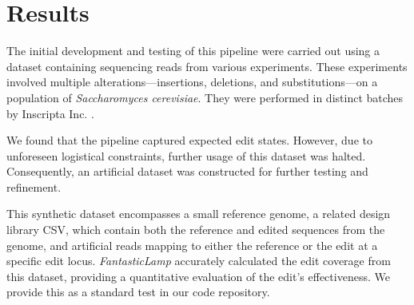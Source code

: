 \documentclass{bioinfo}
\theoremstyle{definition}
\begin{document}

\section*{Results}
\label{sec:results}

The initial development and testing of this pipeline were carried out using a dataset containing sequencing reads from various experiments.
These experiments involved multiple alterations---insertions, deletions, and substitutions---on a population of \textit{Saccharomyces cerevisiae}.
They were performed in distinct batches by Inscripta Inc. \citep{gander2021simultaneous}.

We found that the pipeline captured expected edit states.
However, due to unforeseen logistical constraints, further usage of this dataset was halted.
Consequently, an artificial dataset was constructed for further testing and refinement.

This synthetic dataset encompasses a small reference genome, a related design library CSV, which contain both the reference and edited sequences from the genome, and artificial reads mapping to either the reference or the edit at a specific edit locus. 
\textit{FantasticLamp} accurately calculated the edit coverage from this dataset, providing a quantitative evaluation of the edit's effectiveness.
We provide this as a standard test in our code repository.
\end{document}
